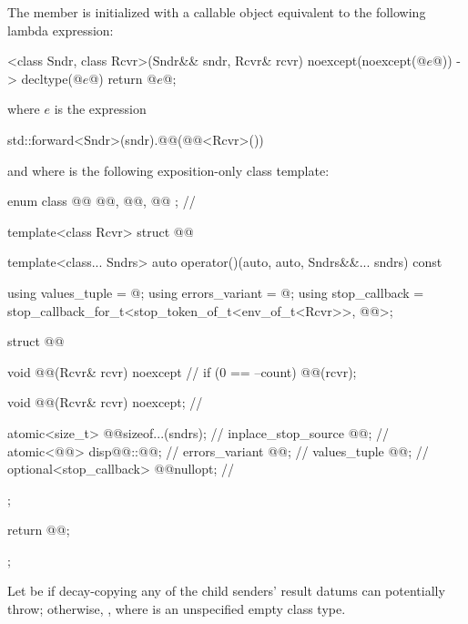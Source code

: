 \pnum
The member 
is initialized with a callable object
equivalent to the following lambda expression:
\begin{codeblock}
[]<class Sndr, class Rcvr>(Sndr&& sndr, Rcvr& rcvr) noexcept(noexcept(@$e$@)) -> decltype(@$e$@) {
  return @$e$@;
}
\end{codeblock}
where $e$ is the expression
\begin{codeblock}
std::forward<Sndr>(sndr).@@(@@<Rcvr>())
\end{codeblock}
and where  is the following exposition-only class template:
\begin{codeblock}
enum class @@ { @@, @@, @@ };             // \expos

template<class Rcvr>
struct @@ {
  template<class... Sndrs>
  auto operator()(auto, auto, Sndrs&&... sndrs) const {
    using values_tuple = @\seebelow@;
    using errors_variant = @\seebelow@;
    using stop_callback = stop_callback_for_t<stop_token_of_t<env_of_t<Rcvr>>, @@>;

    struct @@ {
      void @@(Rcvr& rcvr) noexcept {                        // \expos
        if (0 == --count) {
          @@(rcvr);
        }
      }

      void @@(Rcvr& rcvr) noexcept;                       // \expos

      atomic<size_t> @@{sizeof...(sndrs)};                   // \expos
      inplace_stop_source @@{};                           // \expos
      atomic<@@> disp{@@::@@};           // \expos
      errors_variant @@{};                                  // \expos
      values_tuple @@{};                                    // \expos
      optional<stop_callback> @@{nullopt};                 // \expos
    };

    return @@{};
  }
};
\end{codeblock}

\pnum
Let  be 
if decay-copying any of the child senders' result datums can potentially throw;
otherwise, ,
where  is an unspecified empty class type.

